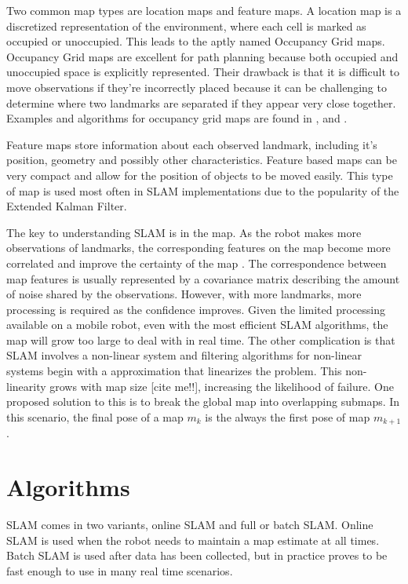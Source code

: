 Two common map types are location maps and feature maps.  A location map is a discretized representation of the environment, where each cell is marked as occupied or unoccupied.  This leads to the aptly named Occupancy Grid maps. Occupancy Grid maps are excellent for path planning because both occupied and unoccupied space is explicitly represented.  Their drawback is that it is difficult to move observations if they’re incorrectly placed because it can be challenging to determine where two landmarks are separated if they appear very close together.   Examples and algorithms for occupancy grid maps are found in \cite{ThrunPR2005}, \cite{lee2007feature} and \cite{eliazar2004dp}.  

Feature maps store information about each observed landmark, including it’s position, geometry and possibly other characteristics.  Feature based maps can be very compact and allow for the position of objects to be moved easily.  This type of map is used most often in SLAM implementations due to the popularity of the Extended Kalman Filter.  

The key to understanding SLAM is in the map.  As the robot makes more observations of landmarks, the corresponding features on the map become more correlated and improve the certainty of the map \cite{durrant2006simultaneous}.  The correspondence between map features is usually represented by a covariance matrix describing the amount of noise shared by the observations. However, with more landmarks, more processing is required as the confidence improves.  Given the limited processing available on a mobile robot, even with the most efficient SLAM algorithms, the map will grow too large to deal with in real time.  The other complication is that SLAM involves a non-linear system and filtering algorithms for non-linear systems begin with a approximation that linearizes the problem.  This non-linearity grows with map size [cite me!!], increasing the likelihood of failure.  One proposed solution to this is to break the global map into overlapping submaps.  In this scenario, the final pose of a map $m_{k}$ is the always the first pose of map $m_{k+1}$.  

\section{Algorithms}
SLAM comes in two variants, online SLAM and full or batch SLAM.  Online SLAM is used when the robot needs to maintain a map estimate at all times.  Batch SLAM is used after data has been collected, but in practice proves to be fast enough to use in many real time scenarios.

